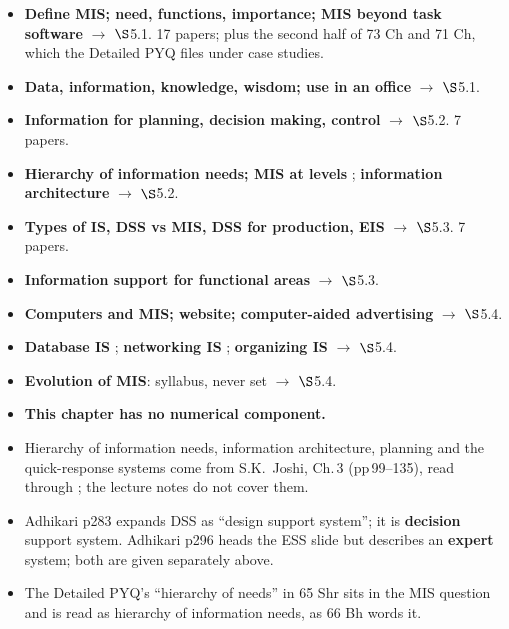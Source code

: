 \begin{itemize}
  \item \textbf{Define MIS; need, functions, importance; MIS beyond task software}
    $\rightarrow$ $\S$5.1. 17 papers; plus the second half of 73 Ch and 71 Ch, which the
    Detailed PYQ files under case studies.
  \item \textbf{Data, information, knowledge, wisdom; use in an office}  $\rightarrow$ $\S$5.1.
  \item \textbf{Information for planning, decision making, control} $\rightarrow$ $\S$5.2.
    7 papers.
  \item \textbf{Hierarchy of information needs; MIS at levels} ; \textbf{information architecture}  $\rightarrow$ $\S$5.2.
  \item \textbf{Types of IS, DSS vs MIS, DSS for production, EIS} $\rightarrow$ $\S$5.3.
    7 papers.
  \item \textbf{Information support for functional areas} $\rightarrow$ $\S$5.3.
  \item \textbf{Computers and MIS; website; computer-aided advertising} $\rightarrow$
    $\S$5.4. 
  \item \textbf{Database IS} ;
    \textbf{networking IS} ; \textbf{organizing IS}
     $\rightarrow$ $\S$5.4.
  \item \textbf{Evolution of MIS}: syllabus, never set $\rightarrow$ $\S$5.4.
\end{itemize}

\begin{itemize}
  \item \textbf{This chapter has no numerical component.}
\end{itemize}

\begin{itemize}
  \item Hierarchy of information needs, information architecture, planning and the
    quick-response systems come from S.K.\ Joshi, Ch.\,3 (pp\,99--135), read through
    ; the lecture notes do not cover them.
  \item Adhikari p283 expands DSS as ``design support system''; it is \textbf{decision}
    support system. Adhikari p296 heads the ESS slide but describes an \textbf{expert}
    system; both are given separately above.
  \item The Detailed PYQ's ``hierarchy of needs'' in 65 Shr sits in the MIS question and is
    read as hierarchy of information needs, as 66 Bh words it.
\end{itemize}

